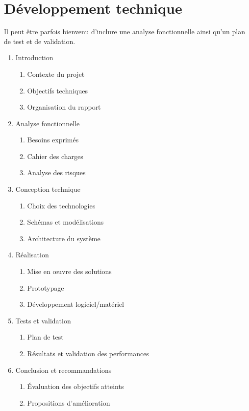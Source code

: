 \newpage

\section{Développement technique}

Il peut être parfois bienvenu d'inclure une analyse fonctionnelle ainsi qu'un plan de test et de validation.

\begin{enumerate}[label=\arabic*.]
    \item Introduction
          \begin{enumerate}[label=\arabic{enumi}.\arabic*]
              \item Contexte du projet
              \item Objectifs techniques
              \item Organisation du rapport
          \end{enumerate}
    \item Analyse fonctionnelle
          \begin{enumerate}[label=\arabic{enumi}.\arabic*]
              \item Besoins exprimés
              \item Cahier des charges
              \item Analyse des risques
          \end{enumerate}
    \item Conception technique
          \begin{enumerate}[label=\arabic{enumi}.\arabic*]
              \item Choix des technologies
              \item Schémas et modélisations
              \item Architecture du système
          \end{enumerate}
    \item Réalisation
          \begin{enumerate}[label=\arabic{enumi}.\arabic*]
              \item Mise en œuvre des solutions
              \item Prototypage
              \item Développement logiciel/matériel
          \end{enumerate}
    \item Tests et validation
          \begin{enumerate}[label=\arabic{enumi}.\arabic*]
              \item Plan de test
              \item Résultats et validation des performances
          \end{enumerate}
    \item Conclusion et recommandations
          \begin{enumerate}[label=\arabic{enumi}.\arabic*]
              \item Évaluation des objectifs atteints
              \item Propositions d'amélioration
          \end{enumerate}

\end{enumerate}

